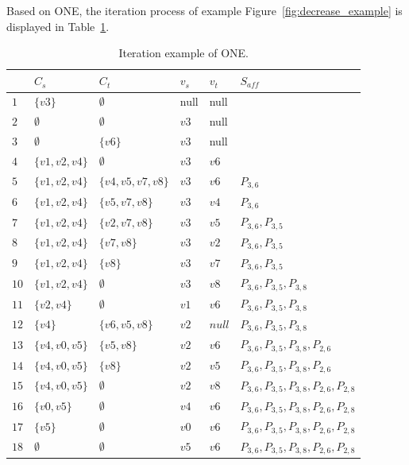 Based on ONE, the iteration process of example Figure~\ref{fig:decrease_example} is displayed in Table~\ref{tab:algo2}.
\begin{table}[htbp]
	\centering
	\caption{Iteration example of ONE.}
	\begin{tabular}{|l|l|l|l|l|l|}
    \hline
     & $C_s$ & $C_t$ & $v_s$ & $v_t$ & $S_\textit{aff}$ \\
    \hline
    $1$ & $\{v3\}$ 		  & $\emptyset$ 	  & null & null &  \\
    $2$ & $\emptyset$	  & $\emptyset$       & $v3$ & null &  \\
    $3$ & $\emptyset$  & $\{v6\}$          & $v3$ & null &  \\
	$4$ & $\{v1,v2,v4\}$  & $\emptyset$ 	  & $v3$ & $v6$ &  \\
    $5$ & $\{v1,v2,v4\}$  & $\{v4,v5,v7,v8\}$ & $v3$ & $v6$ & $P_{3,6}$ \\
    $6$ & $\{v1,v2,v4\}$  & $\{v5,v7,v8\}$    & $v3$ & $v4$ & $P_{3,6}$ \\
    $7$ & $\{v1,v2,v4\}$  & $\{v2,v7,v8\}$ 	  & $v3$ & $v5$ & $P_{3,6},P_{3,5}$ \\
    $8$ & $\{v1,v2,v4\}$  & $\{v7,v8\}$ 	  & $v3$ & $v2$ & $P_{3,6},P_{3,5}$ \\
    $9$ & $\{v1,v2,v4\}$ & $\{v8\}$ 		  & $v3$ & $v7$ & $P_{3,6},P_{3,5}$ \\
    $10$ & $\{v1,v2,v4\}$ & $\emptyset$ 	  & $v3$ & $v8$ & $P_{3,6},P_{3,5},P_{3,8}$ \\
    $11$ & $\{v2,v4\}$ 	  & $\emptyset$ 	  & $v1$ & $v6$ & $P_{3,6},P_{3,5},P_{3,8}$ \\
    $12$ & $\{v4\}$		  & $\{v6,v5,v8\}$ 	  & $v2$ & $null$ & $P_{3,6},P_{3,5},P_{3,8}$ \\
    $13$ & $\{v4,v0,v5\}$		  & $\{v5,v8\}$ 	      & $v2$ & $v6$ & $P_{3,6},P_{3,5},P_{3,8},P_{2,6}$ \\
    $14$ & $\{v4,v0,v5\}$		  & $\{v8\}$ 	      & $v2$ & $v5$ & $P_{3,6},P_{3,5},P_{3,8},P_{2,6}$ \\
    $15$ & $\{v4,v0,v5\}$		  & $\emptyset$ 	  & $v2$ & $v8$ & $P_{3,6},P_{3,5},P_{3,8},P_{2,6},P_{2,8}$ \\
    $16$ & $\{v0,v5\}$ 	  & $\emptyset$ 	  & $v4$ & $v6$ & $P_{3,6},P_{3,5},P_{3,8},P_{2,6},P_{2,8}$\\
    $17$ & $\{v5\}$ 	  & $\emptyset$ 	  & $v0$ & $v6$ & $P_{3,6},P_{3,5},P_{3,8},P_{2,6},P_{2,8}$\\
    $18$ & $\emptyset$ 	  & $\emptyset$ 	  & $v5$ & $v6$ & $P_{3,6},P_{3,5},P_{3,8},P_{2,6},P_{2,8}$ \\
    \hline
    \end{tabular}
    \label{tab:algo2}
\end{table}

